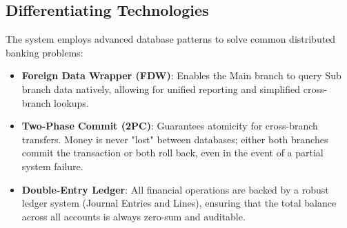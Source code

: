 \subsection{Differentiating Technologies}
The system employs advanced database patterns to solve common distributed banking problems:
\begin{itemize}
  \item \textbf{Foreign Data Wrapper (FDW)}: Enables the Main branch to query Sub branch data natively, allowing for unified reporting and simplified cross-branch lookups.
  \item \textbf{Two-Phase Commit (2PC)}: Guarantees atomicity for cross-branch transfers. Money is never "lost" between databases; either both branches commit the transaction or both roll back, even in the event of a partial system failure.
  \item \textbf{Double-Entry Ledger}: All financial operations are backed by a robust ledger system (Journal Entries and Lines), ensuring that the total balance across all accounts is always zero-sum and auditable.
\end{itemize}
